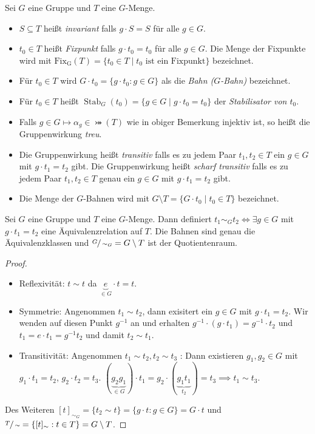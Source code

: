 \begin{definition}
	Sei $G$ eine Gruppe und $T$ eine $G$-Menge.
	\begin{itemize}
		\item $S \subseteq T$ heißt \emph{invariant} falls $g \cdot S = S$ für alle $g \in G$.
		\item $t_0 \in T$ heißt \emph{Fixpunkt} falls $g \cdot t_0 = t_0$ für alle $g \in G$.
			Die Menge der Fixpunkte wird mit $\operatorname{Fix_{G}}(T) = \{t_0 \in T \mid t_0 \text{ ist ein Fixpunkt}\} $ bezeichnet.
		\item Für $t_0 \in T$ wird $G \cdot t_0 = \{g \cdot t_0 : g \in G\}$ als die \emph{Bahn ($G$-Bahn)} bezeichnet.
		\item Für $t_0 \in T$ heißt $\operatorname{Stab}_{G}(t_0) = \{g \in G \mid g \cdot t_0 = t_0\}$ der \emph{Stabilisator von $t_0$}.
		\item Falls $g \in G \mapsto \alpha_{g} \in \bij(T)$ wie in obiger Bemerkung injektiv ist, so heißt die Gruppenwirkung \emph{treu}.
		\item Die Gruppenwirkung heißt \emph{transitiv} falls es zu jedem Paar $t_1,t_2 \in T$ ein $g \in G$ mit $g \cdot  t_1 = t_2$ gibt.
			Die Gruppenwirkung heißt \emph{scharf transitiv} falls es zu jedem Paar $t_1,t_2 \in T$ genau ein $g \in G$ mit $g \cdot t_1 = t_2$ gibt.
		\item Die Menge der $G$-Bahnen wird mit $G \setminus T = \{G \cdot t_0 \mid t_0 \in T\} $ bezeichnet.
	\end{itemize}
\end{definition}


\begin{lemma}
	Sei $G$ eine Gruppe und $T$ eine $G$-Menge.
	Dann definiert $t_1 \sim_{G} t_2 \Leftrightarrow \exists g \in G$ mit $g \cdot t_1 = t_2$ eine Äquivalenzrelation auf $T$. Die Bahnen sind genau die Äquivalenzklassen
	und $\sfrac{G}{\sim_{G}} = G \setminus T$ ist der Quotientenraum.
\end{lemma}

\begin{proof}
	\begin{itemize}
		\item Reflexivität: $t \sim t$ da $\underbrace{e}_{\in G} \cdot  t = t$.
		\item Symmetrie: Angenommen $t_1 \sim t_2$, dann exisitert ein $g \in G$ mit $g \cdot t_1 = t_2$.
			Wir wenden auf diesen Punkt $g^{-1}$ an und erhalten $g^{-1} \cdot (g \cdot t_1) = g^{-1} \cdot t_2$ und
			$t_1 = e \cdot t_1 = g^{-1} t_2$ und damit $t_2 \sim t_1$.
		\item Transitivität: Angenommen $t_1 \sim t_2, t_2 \sim t_3$ : Dann existieren $g_1, g_2 \in G$ mit $g_1 \cdot t_1 = t_2$, $g_2 \cdot t_2 = t_3$.
			$(\underbrace{g_2 g_1}_{\in G}) \cdot t_1 = g_2 \cdot (\underbrace{g_1 t_1}_{t_2}) = t_3 \implies t_1 \sim t_3$.
	\end{itemize}
	Des Weiteren $[ t ]_{\sim_{G}} = \{t_2 \sim t\} = \{g \cdot t : g \in G\} = G \cdot t$ und $\sfrac{T}{\sim} = \{[ t ]_{\sim} : t \in T\} = G \setminus T$.
\end{proof}

